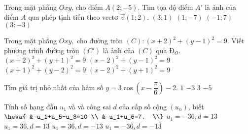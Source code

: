 \begin{ex}%
Trong mặt phẳng $ Oxy$, cho điểm $A\left(2;-5\right)$. Tìm tọa độ điểm $ A’  $ là ảnh của điểm $ A $ qua phép tịnh tiến theo vectơ $\overrightarrow{v}\left(1;2\right)$.
\choice
{$\left(3;1\right)$}
{$\left(1;-7\right)$}
{$\left(-1;7\right)$}
{\True $\left(3;-3\right)$}
\end{ex}
\begin{ex}%
Trong mặt phẳng $ Oxy, $ cho đường tròn $(C):(x+2)^2+(y-1)^2=9$. Viết phương trình đường tròn $\left(C'\right)$ là ảnh của $(C)$ qua $\text{Đ}_O.$
\choice
{$(x+2)^2+(y+1)^2=9$}
{$(x-2)^2+(y-1)^2=9$}
{$(x+1)^2+(y-2)^2=9$}
{\True $(x-2)^2+(y+1)^2=9$}
\end{ex}
\begin{ex}%
Tìm giá trị nhỏ nhất của hàm số $y=3\cos \left(x-\dfrac{\pi}{6}\right)-2.$
\choice
{$ 1 $}
{$-3$}
{$ 3 $}
{\True $-5$}
\end{ex}
\begin{ex}%
Tính số hạng đầu $u_1$ và và công sai $d$ của cấp số cộng $\left(u_n\right)$, biết $\heva{
& u_1+u_5-u_3=10 \\ 
& u_1+u_6=7. \\}$
\choice
{$u_1=-36, d=13$}
{$u_1=36, d=13$}
{\True $u_1=36, d=-13$}
{$u_1=-36, d=-13$}
\end{ex}

